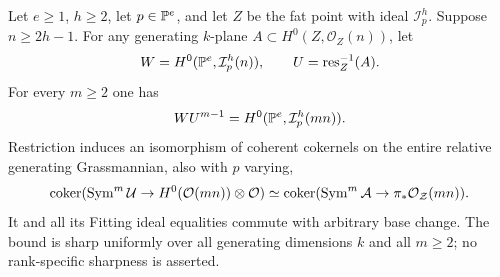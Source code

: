 \begin{theorem}\label{thm:fat-conductor}
Let $e\ge1$, $h\ge2$, let $p\in\mathbb P^e$, and let $Z$ be the fat point
with ideal $\mathcal I_p^h$. Suppose $n\ge2h-1$. For any generating
$k$-plane $A\subset H^0(Z,\mathcal O_Z(n))$, let
\[
 W=H^0(\mathbb P^e,\mathcal I_p^h(n)),\qquad
 U=\operatorname{res}_Z^{-1}(A).
\]
For every $m\ge2$ one has
\begin{equation}\label{eq:fat-saturation}
 WU^{m-1}=H^0(\mathbb P^e,\mathcal I_p^h(mn)).
\end{equation}
Restriction induces an isomorphism of coherent cokernels on the
entire relative generating Grassmannian, also with $p$ varying,
\begin{equation}\label{eq:fat-global-cokernel}
 \operatorname{coker}(\operatorname{Sym}^m\mathcal U\to H^0(\mathcal O(mn))\otimes\mathcal O)
 \simeq
 \operatorname{coker}(\operatorname{Sym}^m\mathcal A\to\pi_*\mathcal O_{\mathcal Z}(mn)).
\end{equation}
It and all its Fitting ideal equalities commute with arbitrary base
change. The bound is sharp uniformly over all generating dimensions
$k$ and all $m\ge2$; no rank-specific sharpness is asserted.
\end{theorem}
